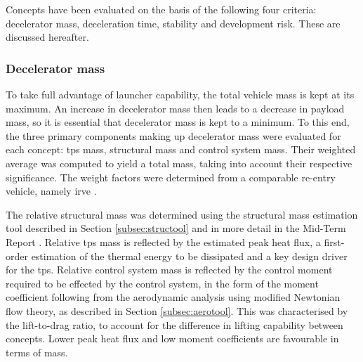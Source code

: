 Concepts have been evaluated on the basis of the following four criteria: decelerator mass, deceleration time, stability and development risk. These are discussed hereafter.

\subsubsection{Decelerator mass}
To take full advantage of launcher capability, the total vehicle mass is kept at its maximum. An increase in decelerator mass then leads to a decrease in payload mass, so it is essential that decelerator mass is kept to a minimum. To this end, the three primary components making up decelerator mass were evaluated for each concept: \gls{tps} mass, structural mass and control system mass. Their weighted average was computed to yield a total mass, taking into account their respective significance. The weight factors were determined from a comparable re-entry vehicle, namely \gls{irve} \cite{Hughes2005}.

The relative structural mass was determined using the structural mass estimation tool described in Section \ref{subsec:structool} and in more detail in the Mid-Term Report \cite[p.47-66]{Balasooriyan2015b}. Relative \gls{tps} mass is reflected by the estimated peak heat flux, a first-order estimation of the thermal energy to be dissipated and a key design driver for the \gls{tps}. Relative control system mass is reflected by the control moment required to be effected by the control system, in the form of the moment coefficient following from the aerodynamic analysis using modified Newtonian flow theory, as described in Section \ref{subsec:aerotool}. This was characterised by the lift-to-drag ratio, to account for the difference in lifting capability between concepts. Lower peak heat flux and low moment coefficients are favourable in terms of mass. 

